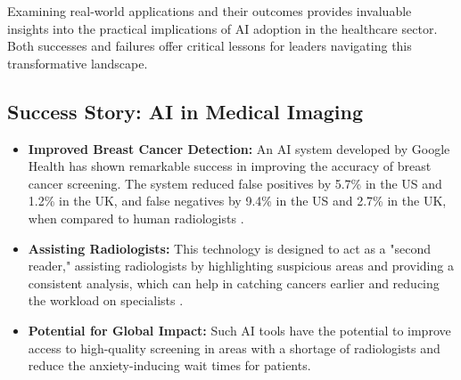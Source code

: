 Examining real-world applications and their outcomes provides invaluable insights into the practical implications of AI adoption in the healthcare sector. Both successes and failures offer critical lessons for leaders navigating this transformative landscape.

\subsection{Success Story: AI in Medical Imaging}
\begin{itemize}
    \item \textbf{Improved Breast Cancer Detection:} An AI system developed by Google Health has shown remarkable success in improving the accuracy of breast cancer screening. The system reduced false positives by 5.7\% in the US and 1.2\% in the UK, and false negatives by 9.4\% in the US and 2.7\% in the UK, when compared to human radiologists \cite{MedAISolutions_GoogleHealth}.
    \item \textbf{Assisting Radiologists:} This technology is designed to act as a "second reader," assisting radiologists by highlighting suspicious areas and providing a consistent analysis, which can help in catching cancers earlier and reducing the workload on specialists \cite{HealthGoogle_GoogleHealth}.
    \item \textbf{Potential for Global Impact:} Such AI tools have the potential to improve access to high-quality screening in areas with a shortage of radiologists and reduce the anxiety-inducing wait times for patients.
\end{itemize}

